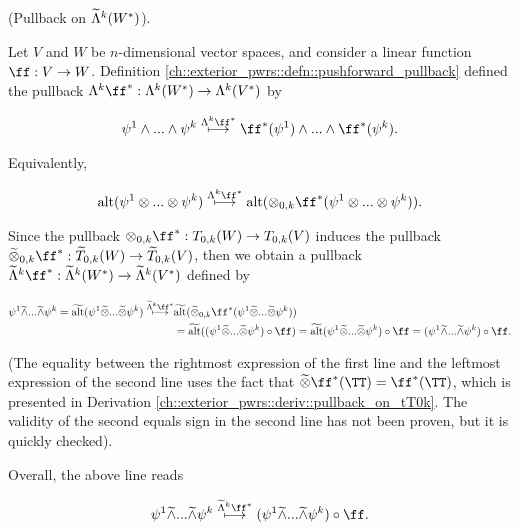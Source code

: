 \begin{deriv}
\label{ch::exterior_pwrs::deriv::pullback_on_exterior_pwr_of_actual_fns}
    (Pullback on $\widetilde{\Lambda}^k(W^*)$).
    
    Let $V$ and $W$ be $n$-dimensional vector spaces, and consider a linear function $\ff:V \rightarrow W$. Definition \ref{ch::exterior_pwrs::defn::pushforward_pullback} defined the pullback $\Lambda^k \ff^*:\Lambda^k(W^*) \rightarrow \Lambda^k(V^*)$ by
    
    \begin{align*}
        \psi^1 \wedge ... \wedge \psi^k \overset{\Lambda^k \ff^*}{\longmapsto} \ff^*(\psi^1) \wedge ... \wedge \ff^*(\psi^k).
    \end{align*}
    
    Equivalently,
    
    \begin{align*}
        \alt(\psi^1 \otimes ... \otimes \psi^k) \overset{\Lambda^k \ff^*}{\longmapsto} \alt(\otimes_{0, k} \ff^*(\psi^1 \otimes ... \otimes \psi^k)).
    \end{align*}
    
    Since the pullback $\otimes_{0, k} \ff^*:T_{0,k}(W) \rightarrow T_{0,k}(V)$ induces the pullback $\totimes_{0,k} \ff^*:\tT_{0,k}(W) \rightarrow \tT_{0,k}(V)$, then we obtain a pullback $\tLambda^k \ff^*:\tLambda^k(W^*) \rightarrow \tLambda^k(V^*)$ defined by
    
    \begin{align*}
        \psi^1 \twedge ... \twedge \psi^k = \talt(\psi^1 \totimes ... \totimes \psi^k) \overset{\tLambda^k \ff^*}{\longmapsto}
        &\talt(\totimes_{0,k} \ff^*(\psi^1 \totimes ... \totimes \psi^k)) \\ 
        &= \talt((\psi^1 \totimes ... \totimes \psi^k) \circ \ff) = \talt(\psi^1 \totimes ... \totimes \psi^k) \circ \ff
        = (\psi^1 \twedge ... \twedge \psi^k) \circ \ff.
    \end{align*}
    
    (The equality between the rightmost expression of the first line and the leftmost expression of the second line uses the fact that $\totimes \ff^*(\TT) = \ff^*(\TT)$, which is presented in Derivation \ref{ch::exterior_pwrs::deriv::pullback_on_tT0k}. The validity of the second equals sign in the second line has not been proven, but it is quickly checked).
    
    Overall, the above line reads
    
    \begin{align*}
        \psi^1 \twedge ... \twedge \psi^k \overset{\tLambda^k \ff^*}{\longmapsto} (\psi^1 \twedge ... \twedge \psi^k) \circ \ff.
    \end{align*}
    

\end{deriv}
